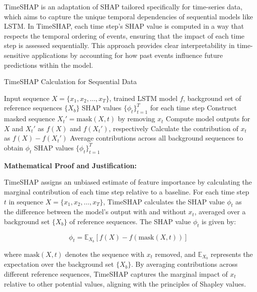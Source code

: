 TimeSHAP is an adaptation of SHAP tailored specifically for time-series data, which aims to capture the unique temporal dependencies of sequential models like LSTM. In TimeSHAP, each time step’s SHAP value is computed in a way that respects the temporal ordering of events, ensuring that the impact of each time step is assessed sequentially. This approach provides clear interpretability in time-sensitive applications by accounting for how past events influence future predictions within the model.

\begin{algorithm}
\caption{TimeSHAP Calculation for Sequential Data}
\begin{algorithmic}[1]
\Require Input sequence $X = \{x_1, x_2, \ldots, x_T\}$, trained LSTM model $f$, background set of reference sequences $\{X_b\}$
\Ensure SHAP values $\{\phi_t\}_{t=1}^T$ for each time step
        \State Construct masked sequence $X_t' = \text{mask}(X, t)$ by removing $x_t$
        \State Compute model outputs for $X$ and $X_t'$ as $f(X)$ and $f(X_t')$, respectively
        \State Calculate the contribution of $x_t$ as $f(X) - f(X_t')$
    \EndFor
    \State Average contributions across all background sequences to obtain $\phi_t$
\EndFor
\State \Return SHAP values $\{\phi_t\}_{t=1}^T$
\end{algorithmic}
\end{algorithm}

\textbf{Mathematical Proof and Justification:}

TimeSHAP assigns an unbiased estimate of feature importance by calculating the marginal contribution of each time step relative to a baseline. For each time step \( t \) in sequence \( X = \{x_1, x_2, \ldots, x_T\} \), TimeSHAP calculates the SHAP value \( \phi_t \) as the difference between the model’s output with and without \( x_t \), averaged over a background set \( \{X_b\} \) of reference sequences. The SHAP value \( \phi_t \) is given by:

\[
\phi_t = \mathbb{E}_{X_b} \left[ f(X) - f(\text{mask}(X, t)) \right]
\]

where \( \text{mask}(X, t) \) denotes the sequence with \( x_t \) removed, and \( \mathbb{E}_{X_b} \) represents the expectation over the background set \( \{X_b\} \). By averaging contributions across different reference sequences, TimeSHAP captures the marginal impact of \( x_t \) relative to other potential values, aligning with the principles of Shapley values.

